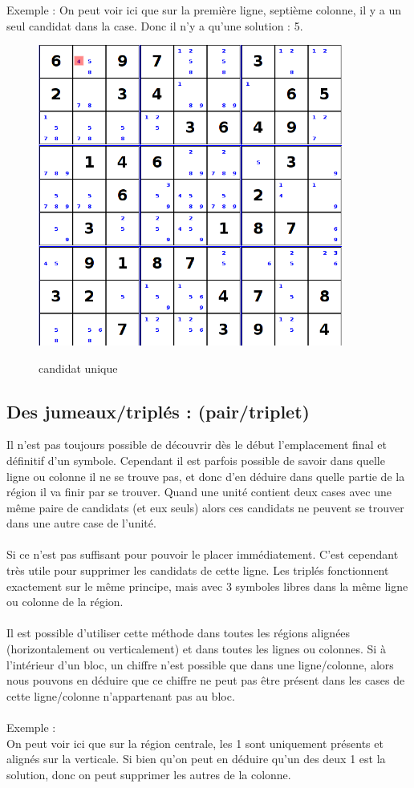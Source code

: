 Exemple :
On peut voir ici que sur la première ligne, septième colonne, il y a un seul candidat 
dans la case. Donc il n'y a qu'une solution : 5.\\

\begin{figure}[ht]
  \caption{\label{annexe2} candidat unique}
  \includegraphics [width=100mm]{images/one-candidate.png} \\[0.5cm]
\end{figure}


\subsection{Des jumeaux/triplés : (pair/triplet)}
Il n'est pas toujours possible de découvrir dès le début l'emplacement final et définitif d'un symbole. 
Cependant il est parfois possible de savoir dans quelle ligne ou colonne il ne se trouve pas, et donc 
d'en déduire dans quelle partie de la région il va finir par se trouver.
Quand une unité contient deux cases avec une même paire de candidats (et eux seuls) alors ces candidats 
ne peuvent se trouver dans une autre case de l'unité. \\
\\
Si ce n'est pas suffisant pour pouvoir le placer immédiatement. C'est cependant très utile pour 
supprimer les candidats de cette ligne.
Les triplés fonctionnent exactement sur le même principe, mais avec 3 symboles libres dans la même 
ligne ou colonne de la région.\\
\\
Il est possible d'utiliser cette méthode dans toutes les régions alignées (horizontalement ou verticalement) 
et dans toutes les lignes ou colonnes.
Si à l’intérieur d’un bloc, un chiffre n’est possible que dans une ligne/colonne, alors
nous pouvons en déduire que ce chiffre ne peut pas être présent dans les cases de cette
ligne/colonne n’appartenant pas au bloc.\\
\\
Exemple :\\
On peut voir ici que sur la région centrale, les 1 sont uniquement présents 
et alignés sur la verticale.
Si bien qu'on peut en déduire qu'un des deux 1 est la solution, 
donc on peut supprimer les autres de la colonne.\\

